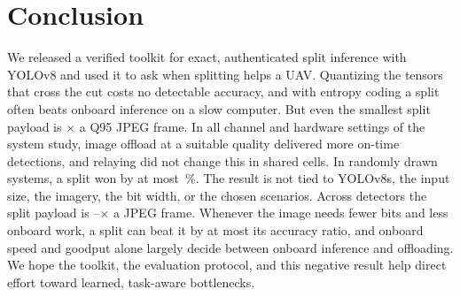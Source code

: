 \documentclass[journal,twocolumn,10pt]{IEEEtran}
\begin{document}
\section{Conclusion}
We released a verified toolkit for exact, authenticated split inference with YOLOv8 and used it to ask when splitting helps a UAV. Quantizing the tensors that cross the cut costs no detectable accuracy, and with entropy coding a split often beats onboard inference on a slow computer. But even the smallest split payload is \RatioMinSplitOverJPEGQNinetyFive$\times$ a Q95 JPEG frame. In all \NumCells{} channel and hardware settings of the system study, image offload at a suitable quality delivered more on-time detections, and relaying did not change this in shared cells. In randomly drawn systems, a split won by at most \GenMaxSplitGainPct\,\%. The result is not tied to YOLOv8s, the input size, the imagery, the bit width, or the chosen scenarios. Across \GenNModels{} detectors the split payload is \GenRatioMin--\GenRatioMax$\times$ a JPEG frame. Whenever the image needs fewer bits and less onboard work, a split can beat it by at most its accuracy ratio, and onboard speed and goodput alone largely decide between onboard inference and offloading. We hope the toolkit, the evaluation protocol, and this negative result help direct effort toward learned, task-aware bottlenecks.



\end{document}
